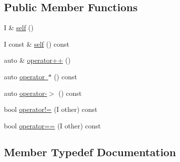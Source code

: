 \subsection*{Public Member Functions}
\begin{DoxyCompactItemize}
\item 
I \& \mbox{\hyperlink{struct_r_a_h___n_a_m_e_s_p_a_c_e_1_1iterator__facade_3_01_i_00_01_r_00_01std_1_1forward__iterator__tag_01_4_abcd2d3dacfa589ef73e2060396e608e1}{self}} ()
\item 
I const  \& \mbox{\hyperlink{struct_r_a_h___n_a_m_e_s_p_a_c_e_1_1iterator__facade_3_01_i_00_01_r_00_01std_1_1forward__iterator__tag_01_4_a6853dfd7232e7cf3d5ae1de49bb635b6}{self}} () const
\item 
auto \& \mbox{\hyperlink{struct_r_a_h___n_a_m_e_s_p_a_c_e_1_1iterator__facade_3_01_i_00_01_r_00_01std_1_1forward__iterator__tag_01_4_adc16af083626269a96471499eec68589}{operator++}} ()
\item 
auto \mbox{\hyperlink{struct_r_a_h___n_a_m_e_s_p_a_c_e_1_1iterator__facade_3_01_i_00_01_r_00_01std_1_1forward__iterator__tag_01_4_a1d9652fca91c16096458efb92c37382c}{operator $\ast$}} () const
\item 
auto \mbox{\hyperlink{struct_r_a_h___n_a_m_e_s_p_a_c_e_1_1iterator__facade_3_01_i_00_01_r_00_01std_1_1forward__iterator__tag_01_4_a9f8cd74432744c43367e65895aaaafdd}{operator-\/$>$}} () const
\item 
bool \mbox{\hyperlink{struct_r_a_h___n_a_m_e_s_p_a_c_e_1_1iterator__facade_3_01_i_00_01_r_00_01std_1_1forward__iterator__tag_01_4_aad842560850dc04c26c37546db0b99ad}{operator!=}} (I other) const
\item 
bool \mbox{\hyperlink{struct_r_a_h___n_a_m_e_s_p_a_c_e_1_1iterator__facade_3_01_i_00_01_r_00_01std_1_1forward__iterator__tag_01_4_a7a86f3c731b79281e425a7e00e69d135}{operator==}} (I other) const
\end{DoxyCompactItemize}


\subsection{Member Typedef Documentation}
\mbox{\label{struct_r_a_h___n_a_m_e_s_p_a_c_e_1_1iterator__facade_3_01_i_00_01_r_00_01std_1_1forward__iterator__tag_01_4_adf499134563d0c20cda17794f2239e1c}} 
